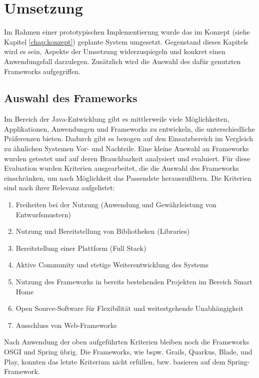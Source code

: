 \chapter{Umsetzung}
\label{chap:umsetzung}
    Im Rahmen einer prototypischen Implementierung wurde das im Konzept (siehe Kapitel \ref{chap:konzept}) geplante System
    umgesetzt. Gegenstand dieses Kapitels wird es sein, Aspekte der Umsetzung widerzuspiegeln und konkret einen  
    Anwendungsfall darzulegen. Zusätzlich wird die Auswahl des dafür genutzten Frameworks aufgegriffen. 

\section{Auswahl des Frameworks}
\label{sec:frameworkauswahl}
    Im Bereich der Java-Entwicklung gibt es mittlerweile viele Möglichkeiten, Applikationen, Anwendungen und Frameworks 
    zu entwickeln, die unterschiedliche Präferenzen bieten. Dadurch gibt es bezogen auf den Einsatzbereich im Vergleich zu ähnlichen Systemen 
    Vor- und Nachteile. Eine kleine Auswahl an Frameworks wurden getestet und auf deren 
    Brauchbarkeit analysiert und evaluiert. Für diese Evaluation wurden Kriterien ausgearbeitet, die die Auswahl des Frameworks 
    einschränken, um nach Möglichkeit das Passendste herauszufiltern. Die Kriterien sind nach ihrer Relevanz aufgelistet: 
    \begin{enumerate}
        \item Freiheiten bei der Nutzung (Anwendung und Gewährleistung von Entwurfsmustern)
        \item Nutzung und Bereitstellung von Bibliotheken (Libraries)
        \item Bereitstellung einer Plattform (Full Stack)
        \item Aktive Community und stetige Weiterentwicklung des Systems
        \item Nutzung des Frameworks in bereits bestehenden Projekten im Bereich Smart Home
        \item Open Source-Software für Flexibilität und weitestgehende Unabhängigkeit
        \item Ausschluss von Web-Frameworks
    \end{enumerate}  
    Nach Anwendung der oben aufgeführten Kriterien bleiben noch die Frameworks \acs{OSGI} und Spring übrig. Die 
    Frameworks, wie bspw. Grails, Quarkus, Blade, und Play, konnten das letzte Kriterium nicht erfüllen, bzw. basieren 
    auf dem Spring-Framework. 

